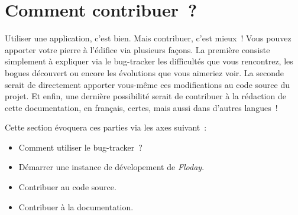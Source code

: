\section{Comment contribuer~?}
	\begin{intro}
	Utiliser une application, c'est bien. Mais contribuer, c'est mieux~!
	Vous pouvez apporter votre pierre à l'édifice via plusieurs façons.
	La première consiste simplement à expliquer via le bug-tracker les difficultés que vous rencontrez, les bogues découvert ou encore les évolutions que vous aimeriez voir.
	La seconde serait de directement apporter vous-même ces modifications au code source du projet.
	Et enfin, une dernière possibilité serait de contribuer à la rédaction de cette documentation, en français, certes, mais aussi dans d'autres langues~!

	Cette section évoquera ces parties via les axes suivant~:
	\begin{itemize}
		\item Comment utiliser le bug-tracker~?
		\item Démarrer une instance de dévelopement de \emph{Floday}.
		\item Contribuer au code source.
		\item Contribuer à la documentation.
	\end{itemize}
\end{intro}





